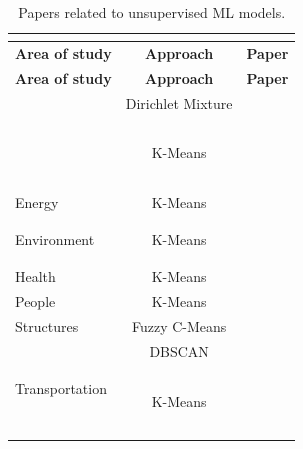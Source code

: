 \documentclass[a4paper,12pt,twoside]{ThesisStyle}
\begin{document}
\renewcommand{\arraystretch}{1.5}
\begin{longtable}{  l  c  l  }
\caption{Papers related to unsupervised ML models.}  \\
\label{taula:PUMLM}  \\
\hline
  \textbf{Area of study} & \textbf{Approach} & \textbf{Paper} \\
\hline 
\endfirsthead
 \hline
  \textbf{Area of study} & \textbf{Approach} & \textbf{Paper} \\
\hline 
\endhead
\hline
\endfoot
\multirow{4}{*}{CyberSecurity} & Dirichlet Mixture & ~\cite{abd2022analyze}  \\
\cline{2-3} 
 & \multirow{3}{*}{K-Means}  & ~\cite{al2018semi}  \\
 &  & ~\cite{bangui2021hybrid}  \\
 &  & ~\cite{karanfilovska2022analysis}  \\
\hline
\multirow{1}{*}{Energy} & \multirow{1}{*}{K-Means}  & ~\cite{du2019clustering}  \\
\hline
\multirow{2}{*}{Environment} & \multirow{2}{*}{K-Means}  & ~\cite{mohamudally2018building}  \\
 &  & ~\cite{hangan2022advanced}  \\
\hline
\multirow{1}{*}{Health} & \multirow{1}{*}{K-Means}  & ~\cite{abu2022automated}  \\
\hline
\multirow{1}{*}{People} & K-Means & ~\cite{Zhu2020cellular}  \\
\hline
Structures & Fuzzy C-Means & ~\cite{Zinno2022bridges}  \\
\hline
\multirow{4}{*}{Transportation} & \multirow{1}{*}{DBSCAN}  & ~\cite{gomari2021cluster}  \\
\cline{2-3} 
 & \multirow{3}{*}{K-Means}  & ~\cite{Zhao2017passenger}  \\
 &  & ~\cite{belhadi2020space}  \\
 &  & ~\cite{gomari2021cluster}  \\
\end{longtable}
\end{document}
